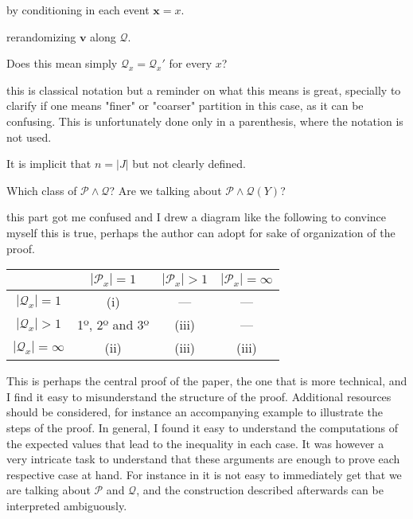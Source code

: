 \documentclass[12pt]{article}
\begin{document}
\begin{itemize}

by conditioning in each event $\mathbf{x} = x$.

rerandomizing $\mathbf{v}$ along $\mathcal Q$.


Does this mean simply $\mathcal Q_x  = \mathcal Q_x' $ for every $x$?


this is classical notation but a reminder on what this means is great, specially to clarify  if one means "finer" or "coarser" partition in this case, as it can be confusing.
This is unfortunately done only in a parenthesis, where the notation is not used.

It is implicit that $n = |J|$ but not clearly defined.

 Which class of $\mathcal P \wedge \mathcal Q$? Are we talking about $\mathcal P \wedge \mathcal Q(Y)$? 

 this part got me confused and I drew a diagram like the following to convince myself this is true, perhaps the author can adopt for sake of organization of the proof.

\begin{center}
\begin{tabular}{|c || c c c||} 
 \hline
  & $|\mathcal P_x| = 1$ &  $|\mathcal P_x| > 1$ & $|\mathcal P_x| = \infty$ \\ [0.5ex] 
 \hline\hline
 $|\mathcal Q_x| = 1$ & (i) & --- & --- \\ 
 \hline
 $|\mathcal Q_x| > 1$ & 1º, 2º and 3º & (iii) & --- \\
 \hline
 $|\mathcal Q_x| = \infty$ & (ii) &  (iii) & (iii) \\
 \hline
\end{tabular}
\end{center}

This is perhaps the central proof of the paper, the one that is more technical, and I find it easy to misunderstand the structure of the proof.
Additional resources should be considered, for instance an accompanying example to illustrate the steps of the proof. 
In general, I found it easy to understand the computations of the expected values that lead to the inequality in each case.
It was however a very intricate task to understand that these arguments are enough to prove each respective case at hand.
For instance in  it is not easy to immediately get that we are talking about $\mathcal P$ and $\mathcal Q$, and the construction described afterwards can be interpreted ambiguously.



\end{itemize}
\end{document}
